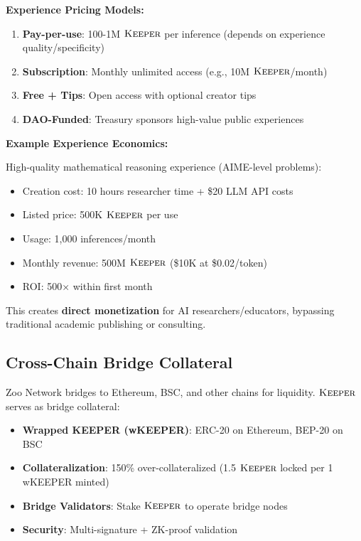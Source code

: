 \textbf{Experience Pricing Models:}
\begin{enumerate}
\item \textbf{Pay-per-use}: 100-1M $\textsc{Keeper}$ per inference (depends on experience quality/specificity)
\item \textbf{Subscription}: Monthly unlimited access (e.g., 10M $\textsc{Keeper}$/month)
\item \textbf{Free + Tips}: Open access with optional creator tips
\item \textbf{DAO-Funded}: Treasury sponsors high-value public experiences
\end{enumerate}

\textbf{Example Experience Economics:}

High-quality mathematical reasoning experience (AIME-level problems):
\begin{itemize}
\item Creation cost: 10 hours researcher time + \$20 LLM API costs
\item Listed price: 500K $\textsc{Keeper}$ per use
\item Usage: 1,000 inferences/month
\item Monthly revenue: 500M $\textsc{Keeper}$ (\$10K at \$0.02/token)
\item ROI: 500× within first month
\end{itemize}

This creates \textbf{direct monetization} for AI researchers/educators, bypassing traditional academic publishing or consulting.

\subsection{Cross-Chain Bridge Collateral}

Zoo Network bridges to Ethereum, BSC, and other chains for liquidity. $\textsc{Keeper}$ serves as bridge collateral:

\begin{itemize}
\item \textbf{Wrapped KEEPER (wKEEPER)}: ERC-20 on Ethereum, BEP-20 on BSC
\item \textbf{Collateralization}: 150\% over-collateralized (1.5 $\textsc{Keeper}$ locked per 1 wKEEPER minted)
\item \textbf{Bridge Validators}: Stake $\textsc{Keeper}$ to operate bridge nodes
\item \textbf{Security}: Multi-signature + ZK-proof validation
\end{itemize}

